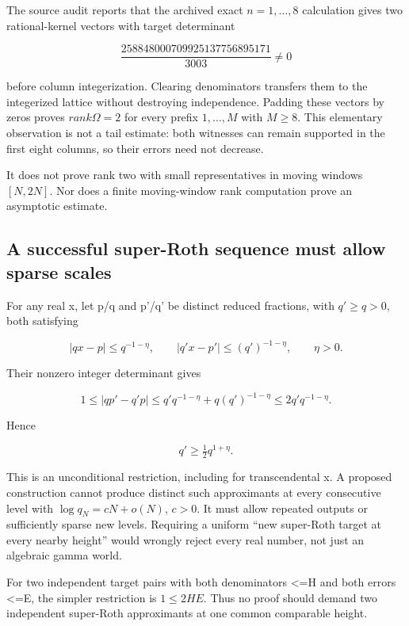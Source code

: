 \documentclass[11pt,a4paper]{article}
\theoremstyle{definition}
\theoremstyle{remark}
\theoremstyle{plain}
\numberwithin{equation}{section}
\def\operatorname#1{#1}\def\mathrm#1{#1}}
\begin{document}
The source audit reports that the archived exact \(n=1,\ldots,8\)
calculation gives two rational-kernel vectors with target determinant

\[
\frac{258848000709925137756895171}{3003}\ne0
\]

before column integerization. Clearing denominators transfers them to
the integerized lattice without destroying independence. Padding these
vectors by zeros proves $\operatorname{rank}\Omega=2$ for every prefix $1,\ldots,M$ with $M\ge8$. This elementary observation is not a tail estimate:
both witnesses can remain supported in the first eight columns, so their
errors need not decrease.

It does not prove rank two with small representatives in moving windows
$[N,2N]$. Nor does a finite moving-window rank computation prove an
asymptotic estimate.

\subsection{A successful super-Roth sequence must allow sparse
scales}\label{sc:au:a-successful-super-roth-sequence-must-allow-sparse-scales}

For any real x, let p/q and p'/q' be distinct reduced fractions, with
\(q'\ge q>0\), both satisfying

\[
|qx-p|\le q^{-1-\eta},\qquad
|q'x-p'|\le(q')^{-1-\eta},\qquad\eta>0.
\]

Their nonzero integer determinant gives

\[
1\le |qp'-q'p|
\le q' q^{-1-\eta}+q(q')^{-1-\eta}
\le2q'q^{-1-\eta}.
\]

Hence

\[
q'\ge\tfrac12q^{1+\eta}.
\]

This is an unconditional restriction, including for transcendental x. A
proposed construction cannot produce distinct such approximants at every
consecutive level with \(\log q_N=cN+o(N)\), \(c>0\). It must allow
repeated outputs or sufficiently sparse new levels. Requiring a uniform
``new super-Roth target at every nearby height'' would wrongly reject
every real number, not just an algebraic gamma world.

For two independent target pairs with both denominators \textless=H and
both errors \textless=E, the simpler restriction is \(1\le2HE\). Thus no
proof should demand two independent super-Roth approximants at one
common comparable height.
\end{document}
